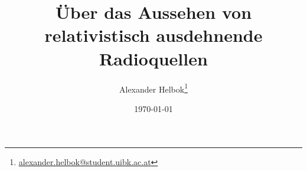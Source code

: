 \thispagestyle{empty}
\titlehead{\texttt{[image: logo.jpg]}}
\title{Über das Aussehen von relativistisch ausdehnende Radioquellen}
\author{Alexander Helbok\thanks{\href{alexander.helbok@student.uibk.ac.at}{alexander.helbok@student.uibk.ac.at}}}
\date{\today}
\maketitle
\vfill 